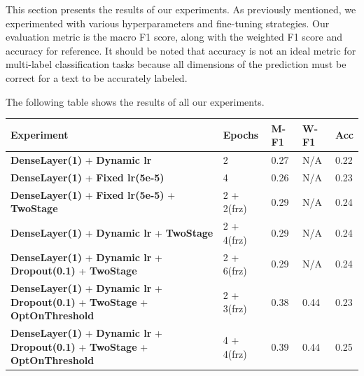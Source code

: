 \documentclass{article}
\begin{document}
This section presents the results of our experiments. As previously mentioned, we experimented with various hyperparameters and fine-tuning strategies. Our evaluation metric is the macro F1 score, along with the weighted F1 score and accuracy for reference. It should be noted that accuracy is not an ideal metric for multi-label classification tasks because all dimensions of the prediction must be correct for a text to be accurately labeled.

The following table shows the results of all our experiments.

\begin{table}[H]
  \centering
  \renewcommand\arraystretch{1.5}
  \begin{tabular}{p{}p{}p{}p{}p{}}
    \hline
    \textbf{Experiment}                                                                                                          & \textbf{Epochs} & \textbf{M-F1} & \textbf{W-F1} & \textbf{Acc} \\
    \hline
    \hline
    \textbf{DenseLayer(1)} + \textbf{Dynamic lr}                                                                                 & 2               & 0.27          & N/A           & 0.22         \\
    \hline
    \textbf{DenseLayer(1)} + \textbf{Fixed lr(5e-5)}                                                                             & 4               & 0.26          & N/A           & 0.23         \\
    \hline
    \textbf{DenseLayer(1)} + \textbf{Fixed lr(5e-5)}  + \textbf{TwoStage}                                                        & 2 + 2(frz)      & 0.29          & N/A           & 0.24         \\
    \hline
    \textbf{DenseLayer(1)} + \textbf{Dynamic lr} + \textbf{TwoStage}                                                             & 2 + 4(frz)      & 0.29          & N/A           & 0.24         \\
    \hline
    \textbf{DenseLayer(1)} + \textbf{Dynamic lr} + \textbf{Dropout(0.1)} +  \textbf{TwoStage}                                    & 2 + 6(frz)      & 0.29          & N/A           & 0.24         \\
    \hline
    \textbf{DenseLayer(1)} + \textbf{Dynamic lr} + \textbf{Dropout(0.1)} + \textbf{TwoStage} +  \textbf{OptOnThreshold}          & 2 + 3(frz)      & 0.38          & 0.44          & 0.23         \\
    \hline
    \textbf{DenseLayer(1)} + \textbf{Dynamic lr} + \textbf{Dropout(0.1)} +  \textbf{TwoStage} + \textbf{OptOnThreshold}          & 4 + 4(frz)      & 0.39          & 0.44          & 0.25         \\

\end{tabular}
\end{table}
\end{document}
